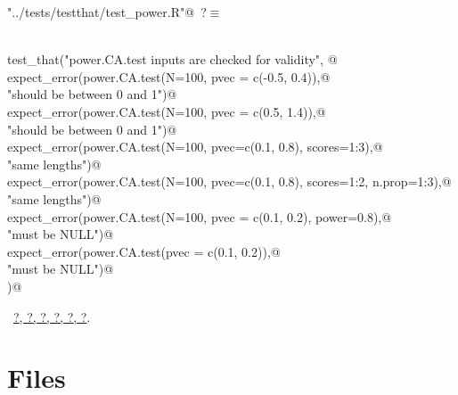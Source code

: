 \documentclass[reqno]{amsart}
\renewcommand{\NWtarget}[2]{\hypertarget{#1}{#2}}
\renewcommand{\NWlink}[2]{\hyperlink{#1}{#2}}
\begin{document}
\begin{flushleft} \small\label{scrap25}\raggedright\small
\NWtarget{nuweb?}{} \verb@"../tests/testthat/test_power.R"@\nobreak\ {\footnotesize {?}}$\equiv$
\vspace{-1ex}
\begin{list}{}{} \item
\mbox{}\verb@@\\
\mbox{}\verb@  test_that("power.CA.test inputs are checked for validity", {@\\
\mbox{}\verb@    expect_error(power.CA.test(N=100, pvec = c(-0.5, 0.4)),@\\
\mbox{}\verb@                "should be between 0 and 1")@\\
\mbox{}\verb@    expect_error(power.CA.test(N=100, pvec = c(0.5, 1.4)),@\\
\mbox{}\verb@                "should be between 0 and 1")@\\
\mbox{}\verb@    expect_error(power.CA.test(N=100, pvec=c(0.1, 0.8), scores=1:3),@\\
\mbox{}\verb@                  "same lengths")@\\
\mbox{}\verb@    expect_error(power.CA.test(N=100, pvec=c(0.1, 0.8), scores=1:2, n.prop=1:3),@\\
\mbox{}\verb@                  "same lengths")@\\
\mbox{}\verb@    expect_error(power.CA.test(N=100, pvec = c(0.1, 0.2), power=0.8),@\\
\mbox{}\verb@                  "must be NULL")@\\
\mbox{}\verb@    expect_error(power.CA.test(pvec = c(0.1, 0.2)),@\\
\mbox{}\verb@                  "must be NULL")@\\
\mbox{}\verb@  })@\\
\mbox{}\verb@@{\NWsep}
\end{list}
\vspace{-1.5ex}
\footnotesize
\begin{list}{}{\setlength{\itemsep}{-\parsep}\setlength{\itemindent}{-\leftmargin}}
\item \NWtxtFileDefBy\ \NWlink{nuweb?}{?}\NWlink{nuweb?}{, ?}\NWlink{nuweb?}{, ?}\NWlink{nuweb?}{, ?}\NWlink{nuweb?}{, ?}\NWlink{nuweb?}{, ?}.

\item{}
\end{list}
\vspace{4ex}
\end{flushleft}
\section{Files}
\end{document}
